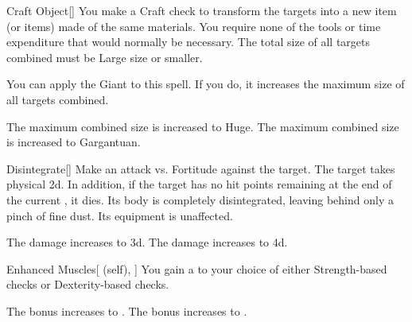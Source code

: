 \lowercase{\hypertarget{spell:Craft Object}{}}\label{spell:Craft Object}
\begin{freeability}[Rank 4]{\hypertarget{spell:Craft Object}{Craft Object}}[]
You make a Craft check to transform the targets into a new item (or items) made of the same materials.
You require none of the tools or time expenditure that would normally be necessary.
The total size of all targets combined must be Large size or smaller.

You can apply the Giant  to this spell.
If you do, it increases the maximum size of all targets combined.

\rankline
{} The maximum combined size is increased to Huge.
 The maximum combined size is increased to Gargantuan.
\end{freeability}
\vspace{0.25em}



\lowercase{\hypertarget{spell:Disintegrate}{}}\label{spell:Disintegrate}
\begin{freeability}[Rank 4]{\hypertarget{spell:Disintegrate}{Disintegrate}}[]
Make an attack vs. Fortitude against the target.
\hit The target takes physical  \plus2d.
In addition, if the target has no hit points remaining at the end of the current , it dies.
Its body is completely disintegrated, leaving behind only a pinch of fine dust.
Its equipment is unaffected.

\rankline
{} The damage increases to  \plus3d.
 The damage increases to  \plus4d.
\end{freeability}
\vspace{0.25em}



\lowercase{\hypertarget{spell:Enhanced Muscles}{}}\label{spell:Enhanced Muscles}
\begin{attuneability}[Rank 4]{\hypertarget{spell:Enhanced Muscles}{Enhanced Muscles}}[ (self), ]
You gain a   to your choice of either Strength-based checks or Dexterity-based checks.

\rankline
{} The bonus increases to .
 The bonus increases to .
\end{attuneability}
\vspace{0.25em}



